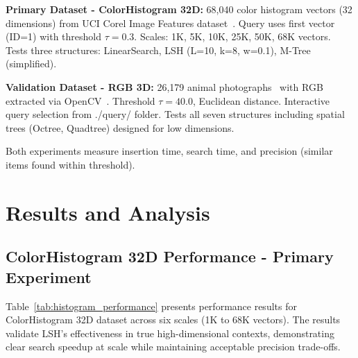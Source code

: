 \documentclass{sbc2023}
\begin{document}
\textbf{Primary Dataset - ColorHistogram 32D:} 68,040 color histogram vectors (32 dimensions) from UCI Corel Image Features dataset~\cite{uci_corel_features}. Query uses first vector (ID=1) with threshold $\tau = 0.3$. Scales: 1K, 5K, 10K, 25K, 50K, 68K vectors. Tests three structures: LinearSearch, LSH (L=10, k=8, w=0.1), M-Tree (simplified).

\textbf{Validation Dataset - RGB 3D:} 26,179 animal photographs~\cite{kaggle_animals10} with RGB extracted via OpenCV~\cite{opencv_library}. Threshold $\tau = 40.0$, Euclidean distance. Interactive query selection from ./query/ folder. Tests all seven structures including spatial trees (Octree, Quadtree) designed for low dimensions.

Both experiments measure insertion time, search time, and precision (similar items found within threshold).


\section{Results and Analysis}
\label{sec:results}

\subsection{ColorHistogram 32D Performance - Primary Experiment}

Table~\ref{tab:histogram_performance} presents performance results for ColorHistogram 32D dataset across six scales (1K to 68K vectors). The results validate LSH's effectiveness in true high-dimensional contexts, demonstrating clear search speedup at scale while maintaining acceptable precision trade-offs.
\end{document}
